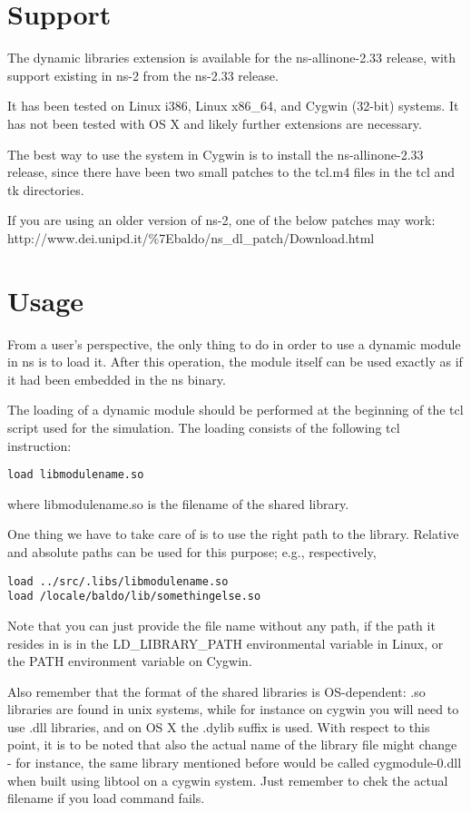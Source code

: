\section{Support}
\label{sec:dynlib:support}

The dynamic libraries extension is available for the ns-allinone-2.33 release, 
with support existing in ns-2 from the ns-2.33 release.

It has been tested on Linux i386, Linux x86\_64, and Cygwin (32-bit) systems.
It has not been tested with OS X and likely further extensions are necessary.

The best way to use the system in Cygwin is to install the 
ns-allinone-2.33 release, since there have been two small patches 
to the tcl.m4 files in the tcl and tk directories.

If you are using an older version of ns-2, one of the below patches
may work:
http://www.dei.unipd.it/\%7Ebaldo/ns\_dl\_patch/Download.html

\section{Usage}
\label{sec:dynlib:usage}
From a user's perspective, the only thing to do in order to use a 
dynamic module in ns is to load it. After this operation, the module 
itself can be used exactly as if it had been embedded in the ns binary.

The loading of a dynamic module should be performed at the beginning 
of the tcl script used for the simulation. The loading consists of the 
following tcl instruction:
\begin{verbatim}
load libmodulename.so
\end{verbatim}
where libmodulename.so is the filename of the shared library.

One thing we have to take care of is to use the right path to the library. 
Relative and absolute paths can be used for this purpose; e.g., respectively,
\begin{verbatim}
load ../src/.libs/libmodulename.so
load /locale/baldo/lib/somethingelse.so
\end{verbatim}

Note that you can just provide the file name without any path, 
if the path it resides in is in the LD\_LIBRARY\_PATH environmental 
variable in Linux, or the PATH environment variable on Cygwin.

Also remember that the format of the shared libraries is OS-dependent: .so 
libraries are found in unix systems, while for instance on cygwin 
you will need to use .dll libraries, and on OS X the .dylib suffix
is used.  With respect to this point, it is to be noted that also the 
actual name of the library file might change - for instance, the same 
library mentioned before would be called cygmodule-0.dll when built using 
libtool on a cygwin system. Just remember to chek the actual filename 
if you load command fails.

